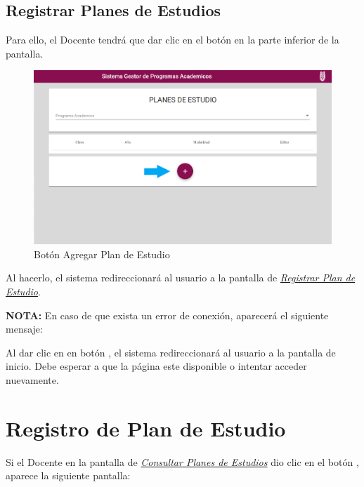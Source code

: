 \subsection{Registrar Planes de Estudios}

Para ello, el Docente tendrá que dar clic en el botón \IUbutton{+} en la parte inferior de la pantalla.

\begin{figure}[!hbtp]
	\centering
	\hypertarget{add}{\includegraphics[width=0.7\linewidth]{images/SP4-GPE/mas}}
	\caption{Botón Agregar Plan de Estudio}
	\label{add}
\end{figure}

Al hacerlo, el sistema redireccionará al usuario a la pantalla de \hyperlink{registrarPE}{\textit{Registrar Plan de Estudio}}.


\textbf{NOTA:} En caso de que exista un error de conexión, aparecerá el siguiente mensaje:

Al dar clic en en botón , el sistema redireccionará al usuario a la pantalla de inicio. Debe esperar a que la página este disponible o intentar acceder nuevamente.


\newpage

\section{Registro de Plan de Estudio}
Si el Docente en la pantalla de \hyperlink{consultarPE}{\textit{Consultar Planes de Estudios}} dio clic en el botón \IUbutton{+}, aparece la siguiente pantalla:

